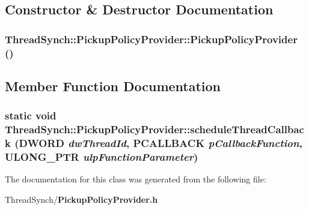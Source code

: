 \subsection{Constructor \& Destructor Documentation}
\subsubsection{\setlength{\rightskip}{0pt plus 5cm}Thread\-Synch::Pickup\-Policy\-Provider::Pickup\-Policy\-Provider ()\hspace{0.3cm}{\tt  [inline, private]}}\label{class_thread_synch_1_1_pickup_policy_provider_8adf7585f9c6b41cebf836b04624188b}




\subsection{Member Function Documentation}
\subsubsection{\setlength{\rightskip}{0pt plus 5cm}static void Thread\-Synch::Pickup\-Policy\-Provider::schedule\-Thread\-Callback (DWORD {\em dw\-Thread\-Id}, {\bf PCALLBACK} {\em p\-Callback\-Function}, ULONG\_\-PTR {\em ulp\-Function\-Parameter})\hspace{0.3cm}{\tt  [static]}}\label{class_thread_synch_1_1_pickup_policy_provider_d57675412b094616d74060cb8e2dbad5}




The documentation for this class was generated from the following file:\begin{CompactItemize}
\item 
Thread\-Synch/{\bf Pickup\-Policy\-Provider.h}\end{CompactItemize}
